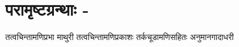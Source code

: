 {~\\[-1.5cm]

\section*{परामृष्टग्रन्थाः -}
\vskip -1cm

\begin{thebibliography}{99}
\itemsep=-1pt
 तत्वचिन्तामणिप्रभा
 माथुरी 
 तत्वचिन्तामणिप्रकाशः तर्कचूडामणिसहितः
 अनुमानगादाधरी
\end{thebibliography}
\vskip -10pt

\articleend
}
